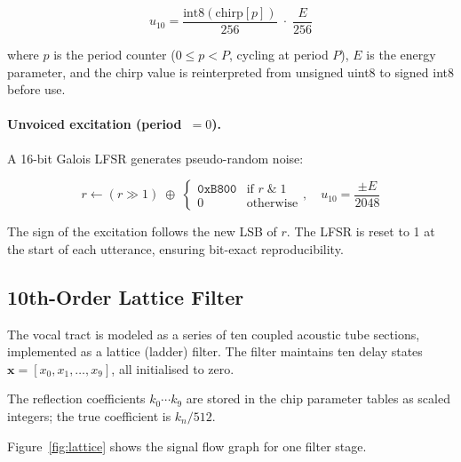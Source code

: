 \documentclass[10pt]{article}
\begin{document}
\begin{equation}
u_{10} = \frac{\text{int8}(\mathrm{chirp}[p])}
              {256} \;\cdot\; \frac{E}{256}
\label{eq:voiced_exc}
\end{equation}

where $p$ is the period counter ($0 \le p < P$, cycling at period $P$), $E$
is the energy parameter, and the chirp value is reinterpreted from unsigned
uint8 to signed int8 before use.

\paragraph{Unvoiced excitation (period~$= 0$).}
A 16-bit Galois LFSR generates pseudo-random noise:

\begin{equation}
r \leftarrow (r \gg 1) \;\oplus\; \begin{cases}
  \texttt{0xB800} & \text{if } r \;\&\; 1 \\
  0               & \text{otherwise}
\end{cases},
\quad u_{10} = \frac{\pm E}{2048}
\label{eq:lfsr}
\end{equation}

The sign of the excitation follows the new LSB of $r$.  The LFSR is reset to
1 at the start of each utterance, ensuring bit-exact reproducibility.

\subsection{10th-Order Lattice Filter}
\label{sec:lattice}

The vocal tract is modeled as a series of ten coupled acoustic tube sections,
implemented as a lattice (ladder) filter.  The filter maintains ten delay
states $\mathbf{x} = [x_0, x_1, \ldots, x_9]$, all initialised to zero.

The reflection coefficients $k_0 \cdots k_9$ are stored in the chip parameter
tables as scaled integers; the true coefficient is $k_n / 512$.

Figure~\ref{fig:lattice} shows the signal flow graph for one filter stage.
\end{document}
